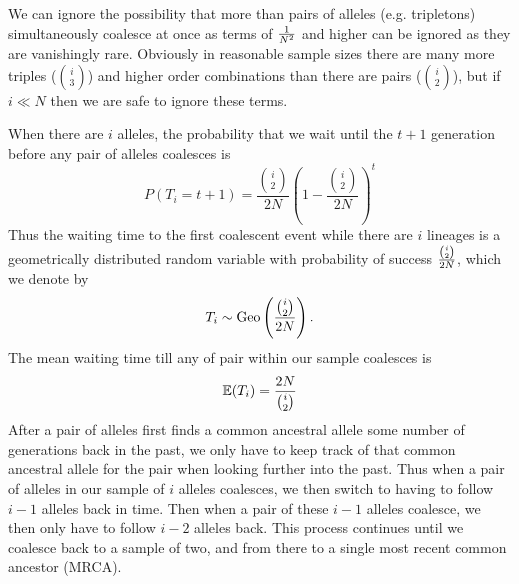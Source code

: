 We can ignore the possibility that more than pairs of alleles (e.g. tripletons)
simultaneously coalesce at once as terms of $\nicefrac{1}{N^2}$ and higher
can be ignored as they are vanishingly rare. Obviously in reasonable
sample sizes there are many more triples (${i \choose 3}$) and higher order
combinations than there are pairs (${i \choose 2}$), but if $i \ll N$ then we are safe to
ignore these terms.


When there are $i$ alleles, the probability that we wait until the
$t+1$ generation before
any pair of alleles coalesces is
\begin{equation}
P(T_i =t+1) = \frac{{i \choose
 2}}{2N}\left( 1- \frac{{i \choose
 2}}{2N}\right)^{t} \label{eqn:T_i}
\end{equation}
Thus the waiting time to the first coalescent event while there are $i$ lineages is a geometrically distributed random variable with probability of success $\nicefrac{{i \choose 2}}{2N}$, which we denote by
\begin{equation}
T_i \sim \text{Geo}
\left(  \nicefrac{{i \choose
      2}}{2N} \right).
\end{equation}
The mean waiting time till any of pair within our
 sample coalesces is
\begin{equation}
\E( T_i) = \frac{2N}{{i \choose  2}}  \label{eqn:E_T_i}
\end{equation}
After a pair of alleles first finds a common ancestral allele some
number of generations back in the past, we only have to keep
track of that common ancestral allele for the pair when looking further into the past. Thus when a pair
of alleles in our sample of $i$ alleles coalesces, we then switch to
having to follow $i-1$ alleles back in time. Then when a pair of these $i-1$
alleles coalesce, we then only have to follow $i-2$ alleles back. This
process continues until we coalesce back to a sample of two, and from
there to a single most recent common ancestor (MRCA).\\


